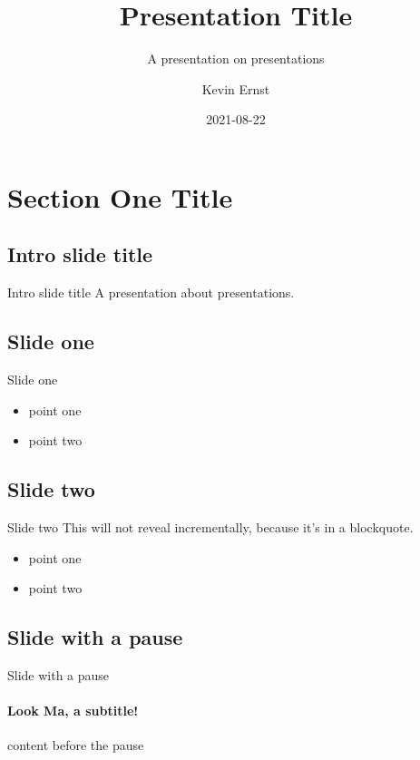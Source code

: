 \documentclass[
  ignorenonframetext,
  aspectratio=169,
]{beamer}
\title{Presentation Title}
\subtitle{A presentation on presentations}
\author{Kevin Ernst}
\date{2021-08-22}
\institute{Weirauch Lab}
\providecommand{\tightlist}{%
  \setlength{\itemsep}{0pt}\setlength{\parskip}{0pt}}
\begin{document}
\frame{\titlepage}

\hypertarget{section-one-title}{%
\section{Section One Title}\label{section-one-title}}

\hypertarget{intro-slide-title}{%
\subsection{Intro slide title}\label{intro-slide-title}}

\begin{frame}{Intro slide title}
A presentation about presentations.
\end{frame}

\hypertarget{slide-one}{%
\subsection{Slide one}\label{slide-one}}

\begin{frame}{Slide one}
\begin{itemize}[<+->]
\tightlist
\item
  point one
\item
  point two
\end{itemize}
\end{frame}

\hypertarget{slide-two}{%
\subsection{Slide two}\label{slide-two}}

\begin{frame}{Slide two}
This will not reveal incrementally, because it's in a blockquote.

\begin{itemize}
\tightlist
\item
  point one
\item
  point two
\end{itemize}
\end{frame}

\hypertarget{slide-with-a-pause}{%
\subsection{Slide with a pause}\label{slide-with-a-pause}}

\begin{frame}{Slide with a pause}
\framesubtitle{Look Ma, a subtitle!}

content before the pause

\pause
\end{frame}
\end{document}
